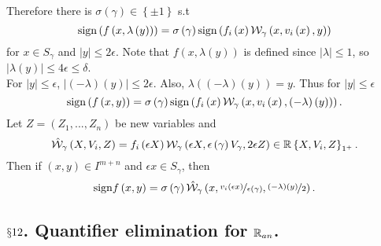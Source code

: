 Therefore there is $\sigma\left(\gamma\right)\in\left\{ \pm1\right\} $
s.t
\[
\mathrm{sign}\left(f\left(x,\lambda\left(y\right)\right)\right)=\sigma\left(\gamma\right)\mathrm{sign}\left(f_{i}\left(x\right)\mathcal{W}_{\gamma}\left(x,v_{i}\left(x\right),y\right)\right)
\]
for $x\in S_{\gamma}$ and $\left|y\right|\leq2\epsilon$. Note that
$f\left(x,\lambda\left(y\right)\right)$ is defined since $\left|\lambda\right|\leq1$,
so $\left|\lambda\left(y\right)\right|\leq4\epsilon\leq\delta$.\\
For $\left|y\right|\leq\epsilon$, $\left|\left(-\lambda\right)\left(y\right)\right|\leq2\epsilon$.
Also, $\lambda\left(\left(-\lambda\right)\left(y\right)\right)=y$.
Thus for $\left|y\right|\leq\epsilon$
\[
\mathrm{sign}\left(f\left(x,y\right)\right)=\sigma\left(\gamma\right)\mathrm{sign}\left(f_{i}\left(x\right)\mathcal{W}_{\gamma}\left(x,v_{i}\left(x\right),\left(-\lambda\right)\left(y\right)\right)\right).
\]
Let $Z=\left(Z_{1},...,Z_{n}\right)$ be new variables and 
\[
\hat{\mathcal{W}}_{\gamma}\left(X,V_{i},Z\right)=f_{i}\left(\epsilon X\right)\mathcal{W}_{\gamma}\left(\epsilon X,\epsilon\left(\gamma\right)V_{\gamma},2\epsilon Z\right)\in\mathbb{R}\left\{ X,V_{i},Z\right\} _{1^{+}}.
\]
Then if $\left(x,y\right)\in I^{m+n}$ and $\epsilon x\in S_{\gamma}$,
then 
\[
\mathrm{sign}f\left(x,y\right)=\sigma\left(\gamma\right)\hat{\mathcal{W}}_{\gamma}\left(x,\nicefrac{v_{i}\left(\epsilon x\right)}{\epsilon\left(\gamma\right)},\nicefrac{\left(-\lambda\right)\left(y\right)}{2}\right).
\]



\subsection*{$\mathsection12$. Quantifier elimination for $\mathbb{R}_{an}$.}

